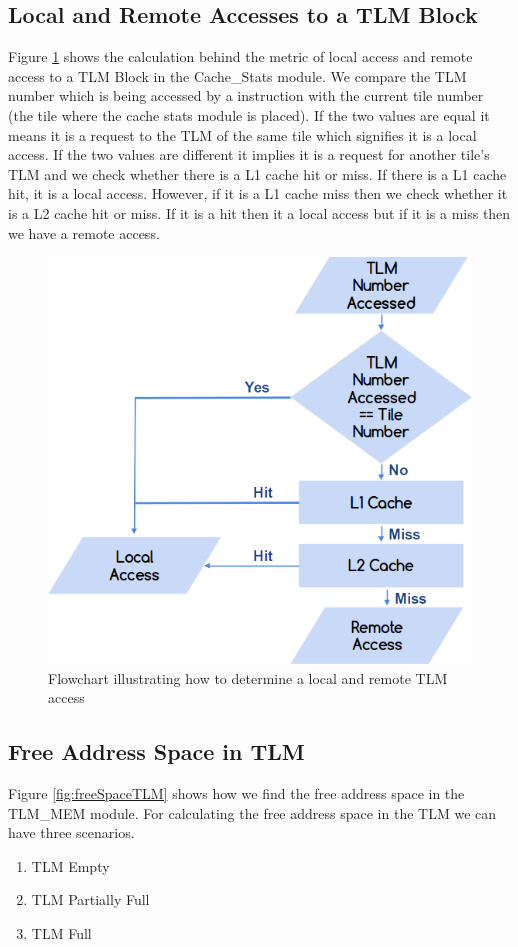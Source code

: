 \documentclass{listhesis}
\begin{document}
\subsection{Local and Remote Accesses to a TLM Block}
Figure \ref{fig:remoteLocalAccess} shows the calculation behind the metric of local access and remote access to a TLM Block in the Cache{\_}Stats module. We compare the TLM number which is being accessed by a instruction with the current tile number (the tile where the cache stats module is placed). If the two values are equal it means it is a request to the TLM of the same tile which signifies it is a local access. If the two values are different it implies it is a request for another tile's TLM and we check whether there is a L1 cache hit or miss. If there is a L1 cache hit, it is a local access. However, if it is a L1 cache miss then we check whether it is a L2 cache hit or miss. If it is a hit then it a local access but if it is a miss then we have a remote access. \\
\begin{figure}
  \includegraphics[width=0.6\linewidth]{localandremote.png}
  \centering
  \caption{Flowchart illustrating how to determine a local and remote TLM access}
  \label{fig:remoteLocalAccess}
\end{figure}

\subsection{Free Address Space in TLM}
Figure \ref{fig:freeSpaceTLM} shows how we find the free address space in the TLM{\_}MEM module. For calculating the free address space in the TLM we can have three scenarios. 
\begin{enumerate}
  \item TLM Empty 
  \item TLM Partially Full
  \item TLM Full
\end{enumerate}
\end{document}
